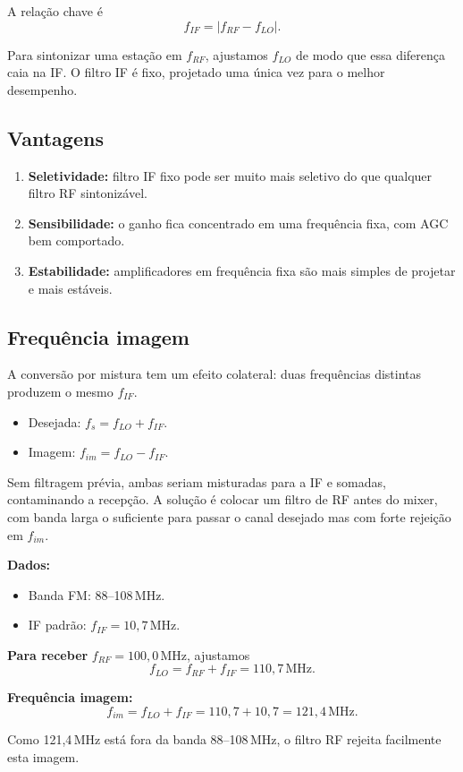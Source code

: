 \documentclass[11pt,a4paper]{article}
\begin{document}
A relação chave é
\[
  f_{IF} = |f_{RF} - f_{LO}|.
\]

Para sintonizar uma estação em $f_{RF}$, ajustamos $f_{LO}$ de modo que essa diferença caia na IF. O filtro IF é fixo, projetado uma única vez para o melhor desempenho.

\subsection{Vantagens}

\begin{enumerate}
  \item \textbf{Seletividade:} filtro IF fixo pode ser muito mais seletivo do que qualquer filtro RF sintonizável.
  \item \textbf{Sensibilidade:} o ganho fica concentrado em uma frequência fixa, com AGC bem comportado.
  \item \textbf{Estabilidade:} amplificadores em frequência fixa são mais simples de projetar e mais estáveis.
\end{enumerate}

\subsection{Frequência imagem}

A conversão por mistura tem um efeito colateral: duas frequências distintas produzem o mesmo $f_{IF}$.
\begin{itemize}
  \item Desejada: $f_s = f_{LO} + f_{IF}$.
  \item Imagem: $f_{im} = f_{LO} - f_{IF}$.
\end{itemize}

Sem filtragem prévia, ambas seriam misturadas para a IF e somadas, contaminando a recepção. A solução é colocar um filtro de RF antes do mixer, com banda larga o suficiente para passar o canal desejado mas com forte rejeição em $f_{im}$.

\begin{exemplo}
\textbf{Dados:}
\begin{itemize}
  \item Banda FM: 88--108\,MHz.
  \item IF padrão: $f_{IF} = 10{,}7$\,MHz.
\end{itemize}

\textbf{Para receber} $f_{RF}=100{,}0$\,MHz, ajustamos
\[
  f_{LO} = f_{RF} + f_{IF} = 110{,}7\,\mathrm{MHz}.
\]

\textbf{Frequência imagem:}
\[
  f_{im} = f_{LO} + f_{IF} = 110{,}7 + 10{,}7 = 121{,}4\,\mathrm{MHz}.
\]

Como 121,4\,MHz está fora da banda 88--108\,MHz, o filtro RF rejeita facilmente esta imagem.
\end{exemplo}
\end{document}
